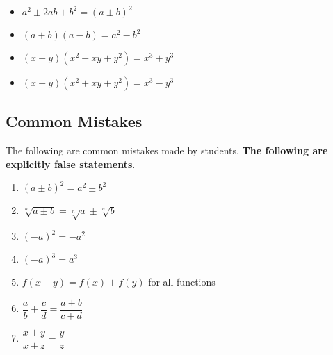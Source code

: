 \documentclass[notes]{subfiles}
\begin{document}
		\begin{rmk}
			\begin{itemize}
				\item \(a^2 \pm 2ab + b^2 = (a\pm b)^2\)
				\item \((a+b)(a-b) = a^2 - b^2\)
				\item \((x+y)(x^2 - xy + y^2) = x^3 + y^3\)
				\item \((x-y)(x^2+xy+y^2) = x^3-y^3\)
			\end{itemize}
		\end{rmk}
	
	\subsection*{Common Mistakes}
		The following are common mistakes made by students. \textbf{The following are explicitly false statements}.
		\begin{enumerate}
			\item \((a \pm b)^2  = a^2 \pm b^2\)
			\item \(\sqrt[n]{a \pm b} = \sqrt[n]{a} \pm \sqrt[n]{b}\)
			\item \((-a)^2 = -a^2\)
			\item \((-a)^3 = a^3\)
			\item \(f(x+y) = f(x) + f(y)\) for all functions
			\item \(\dfrac{a}{b} + \dfrac{c}{d} = \dfrac{a+b}{c+d}\)
			\item \(\dfrac{x + y}{x + z} = \dfrac{y}{z}\)
			
		\end{enumerate}
		
\clearpage
\end{document}
